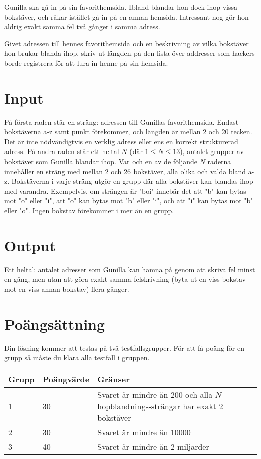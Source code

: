 
Gunilla ska gå in på sin favorithemsida. Ibland blandar hon dock ihop vissa bokstäver, och råkar istället gå in på en annan hemsida. Intressant nog gör hon aldrig exakt samma fel två gånger i samma adress.

Givet adressen till hennes favorithemsida och en beskrivning av vilka bokstäver hon brukar blanda ihop, skriv ut längden på den lista över addresser som hackers borde registrera för att lura in henne på sin hemsida.

\section*{Input}

På första raden står en sträng: adressen till Gunillas favorithemsida. Endast bokstäverna a-z samt punkt förekommer, och längden är mellan 2 och 20 tecken. Det är inte nödvändigtvis en verklig adress eller ens en korrekt strukturerad adress. På andra raden står ett heltal $N$  (där $1 \le N \le 13$), antalet grupper av bokstäver som Gunilla blandar ihop. Var och en av de följande $N$ raderna innehåller en sträng med mellan 2 och 26 bokstäver, alla olika och valda bland a-z. Bokstäverna i varje sträng utgör en grupp där alla bokstäver kan blandas ihop med varandra. Exempelvis, om strängen är "boi" innebär det att "b" kan bytas mot "o" eller "i", att "o" kan bytas mot "b" eller "i", och att "i" kan bytas mot "b" eller "o". Ingen bokstav förekommer i mer än en grupp.

\section*{Output}

Ett heltal: antalet adresser som Gunilla kan hamna på genom att skriva fel minst en gång, men utan att göra exakt samma felskrivning (byta ut en viss bokstav mot en viss annan bokstav) flera gånger.

\section*{Poängsättning}
Din lösning kommer att testas på två testfallsgrupper. För att få poäng för en grupp
så måste du klara alla testfall i gruppen.

\begin{tabular}{| l | l | l |}
\hline
Grupp & Poängvärde & Gränser \\ \hline
1     & 30         & Svaret är mindre än 200 och alla $N$ hopblandnings-strängar har exakt 2 bokstäver \\
2     & 30         & Svaret är mindre än 10000 \\ 
3     & 40         & Svaret är mindre än 2 miljarder \\ \hline
\end{tabular}


